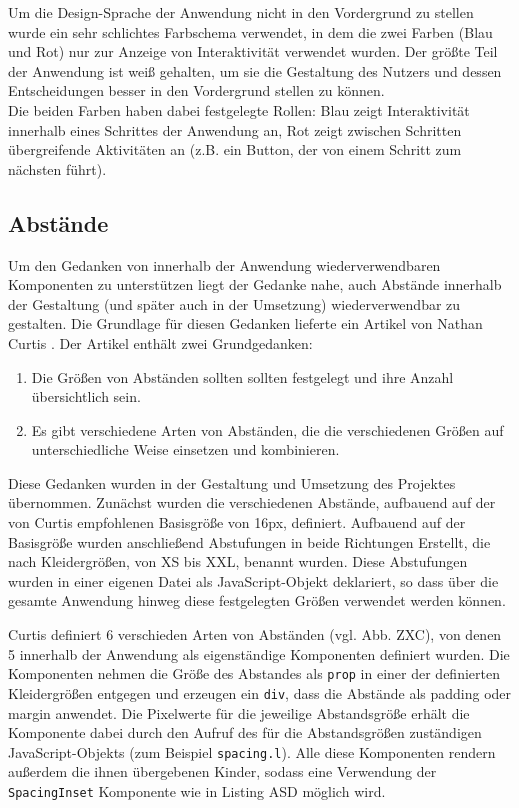 Um die Design-Sprache der Anwendung nicht in den Vordergrund zu stellen wurde ein sehr schlichtes Farbschema verwendet, in dem die zwei Farben (Blau und Rot) nur zur Anzeige von Interaktivität verwendet wurden. Der größte Teil der Anwendung ist weiß gehalten, um sie die Gestaltung des Nutzers und dessen Entscheidungen besser in den Vordergrund stellen zu können.\\
Die beiden Farben haben dabei festgelegte Rollen: Blau zeigt Interaktivität innerhalb eines Schrittes der Anwendung an, Rot zeigt zwischen Schritten übergreifende Aktivitäten an (z.B. ein Button, der von einem Schritt zum nächsten führt).

\subsection{Abstände}
Um den Gedanken von innerhalb der Anwendung wiederverwendbaren Komponenten zu unterstützen liegt der Gedanke nahe, auch Abstände innerhalb der Gestaltung (und später auch in der Umsetzung) wiederverwendbar zu gestalten. Die Grundlage für diesen Gedanken lieferte ein Artikel von Nathan Curtis \cite{CurtisSpace16}. Der Artikel enthält zwei Grundgedanken:

\begin{enumerate}
  \item Die Größen von Abständen sollten sollten festgelegt und ihre Anzahl übersichtlich sein.
  \item Es gibt verschiedene Arten von Abständen, die die verschiedenen Größen auf unterschiedliche Weise einsetzen und kombinieren.
\end{enumerate}

Diese Gedanken wurden in der Gestaltung und Umsetzung des Projektes übernommen. Zunächst wurden die verschiedenen Abstände, aufbauend auf der von Curtis empfohlenen Basisgröße von 16px, definiert. Aufbauend auf der Basisgröße wurden anschließend Abstufungen in beide Richtungen
Erstellt, die nach Kleidergrößen, von XS bis XXL, benannt wurden.
Diese Abstufungen wurden in einer eigenen Datei als JavaScript-Objekt deklariert, so dass über die gesamte Anwendung hinweg diese festgelegten Größen verwendet werden können.

Curtis definiert 6 verschieden Arten von Abständen (vgl. Abb. ZXC), von denen 5 innerhalb der Anwendung als eigenständige Komponenten definiert wurden.
Die Komponenten nehmen die Größe des Abstandes als \verb|prop| in einer der definierten Kleidergrößen entgegen und erzeugen ein \verb|div|, dass die Abstände als padding oder margin anwendet.
Die Pixelwerte für die jeweilige Abstandsgröße erhält die Komponente dabei durch den Aufruf des für die Abstandsgrößen zuständigen JavaScript-Objekts (zum Beispiel \verb|spacing.l|). Alle diese Komponenten rendern außerdem die ihnen übergebenen Kinder, sodass eine Verwendung der \verb|SpacingInset| Komponente wie in Listing ASD möglich wird.

